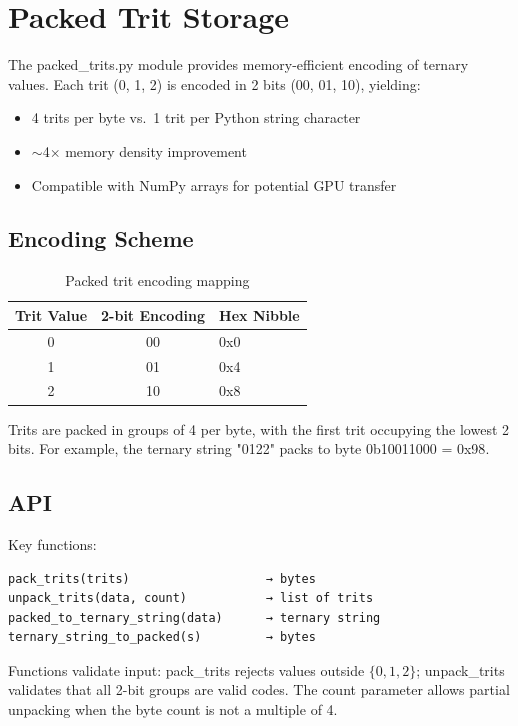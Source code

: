 \documentclass[12pt,a4paper,twoside]{book}
\theoremstyle{trinarytheorem}
\theoremstyle{trinarydefinition}
\newcommand{\code}[1]{\textsf{#1}}
\begin{document}
\section{Packed Trit Storage}

The \code{packed\_trits.py} module provides memory-efficient encoding of ternary
values. Each trit (0, 1, 2) is encoded in 2 bits (00, 01, 10), yielding:
\begin{itemize}
    \item 4 trits per byte vs.\ 1 trit per Python string character
    \item $\sim$4$\times$ memory density improvement
    \item Compatible with NumPy arrays for potential GPU transfer
\end{itemize}

\subsection{Encoding Scheme}

\begin{table}[H]
\centering
\caption{Packed trit encoding mapping}
\label{tab:packedenc}
\begin{tabular}{ccl}
\toprule
Trit Value & 2-bit Encoding & Hex Nibble \\
\midrule
0 & 00 & 0x0 \\
1 & 01 & 0x4 \\
2 & 10 & 0x8 \\
\bottomrule
\end{tabular}
\end{table}

Trits are packed in groups of 4 per byte, with the first trit occupying the
lowest 2 bits. For example, the ternary string \code{"0122"} packs to byte
\code{0b10011000 = 0x98}.

\subsection{API}

Key functions:
\begin{verbatim}
pack_trits(trits)                   → bytes
unpack_trits(data, count)           → list of trits
packed_to_ternary_string(data)      → ternary string
ternary_string_to_packed(s)         → bytes
\end{verbatim}

Functions validate input: \code{pack\_trits} rejects values outside $\{0,1,2\}$;
\code{unpack\_trits} validates that all 2-bit groups are valid codes.
The \code{count} parameter allows partial unpacking when the byte count is not
a multiple of 4.
\end{document}
